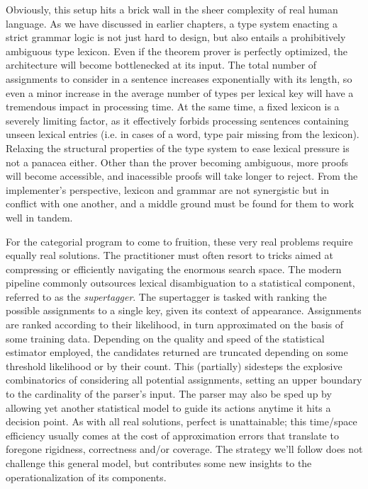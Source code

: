 Obviously, this setup hits a brick wall in the sheer complexity of real human language.
As we have discussed in earlier chapters, a type system enacting a strict grammar logic is not just hard to design, but also entails a prohibitively ambiguous type lexicon.
Even if the theorem prover is perfectly optimized, the architecture will become bottlenecked at its input.
The total number of assignments to consider in a sentence increases exponentially with its length, so even a minor increase in the average number of types per lexical key will have a tremendous impact in processing time.
At the same time, a fixed lexicon is a severely limiting factor, as it effectively forbids processing sentences containing unseen lexical entries (i.e. in cases of a \textlangle word, type\textrangle{} pair missing from the lexicon).
Relaxing the structural properties of the type system to ease lexical pressure is not a panacea either.
Other than the prover becoming ambiguous, more proofs will become accessible, and inacessible proofs will take longer to reject.
From the implementer's perspective, lexicon and grammar are not synergistic but in conflict with one another, and a middle ground must be found for them to work well in tandem.

For the categorial program to come to fruition, these very real problems require equally real solutions.
The practitioner must often resort to tricks aimed at compressing or efficiently navigating the enormous search space.
The modern pipeline commonly outsources lexical disambiguation to a statistical component, referred to as the \textit{supertagger}.
The supertagger is tasked with ranking the possible assignments to a single key, given its context of appearance.
Assignments are ranked according to their likelihood, in turn approximated on the basis of some training data.
Depending on the quality and speed of the statistical estimator employed, the candidates returned are truncated depending on some threshold likelihood or by their count.
This (partially) sidesteps the explosive combinatorics of considering all potential assignments, setting an upper boundary to the cardinality of the parser's input.
The parser may also be sped up by allowing yet another statistical model to guide its actions anytime it hits a decision point.
As with all real solutions, perfect is unattainable; this time/space efficiency usually comes at the cost of approximation errors that translate to foregone rigidness, correctness and/or coverage.
The strategy we'll follow does not challenge this general model, but contributes some new insights to the operationalization of its components.

